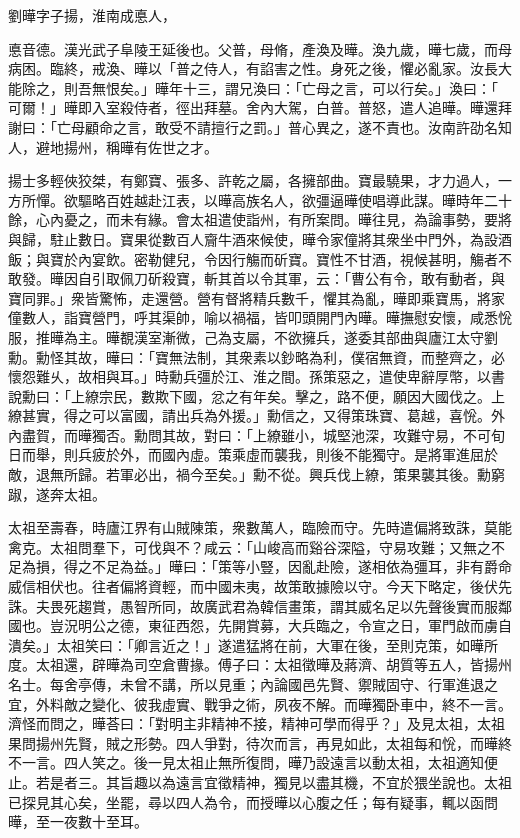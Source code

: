 
\begin{pinyinscope}
劉曄字子揚，淮南成悳人，

悳音德。漢光武子阜陵王延後也。父普，母脩，產渙及曄。渙九歲，曄七歲，而母病困。臨終，戒渙、曄以「普之侍人，有諂害之性。身死之後，懼必亂家。汝長大能除之，則吾無恨矣。」曄年十三，謂兄渙曰：「亡母之言，可以行矣。」渙曰：「𨚗可爾！」曄即入室殺侍者，徑出拜墓。舍內大駕，白普。普怒，遣人追曄。曄還拜謝曰：「亡母顧命之言，敢受不請擅行之罰。」普心異之，遂不責也。汝南許劭名知人，避地揚州，稱曄有佐世之才。

揚士多輕俠狡桀，有鄭寶、張多、許乾之屬，各擁部曲。寶最驍果，才力過人，一方所憚。欲驅略百姓越赴江表，以曄高族名人，欲彊逼曄使唱導此謀。曄時年二十餘，心內憂之，而未有緣。會太祖遣使詣州，有所案問。曄往見，為論事勢，要將與歸，駐止數日。寶果從數百人齎牛酒來候使，曄令家僮將其衆坐中門外，為設酒飯；與寶於內宴飲。密勒健兒，令因行觴而斫寶。寶性不甘酒，視候甚明，觴者不敢發。曄因自引取佩刀斫殺寶，斬其首以令其軍，云：「曹公有令，敢有動者，與寶同罪。」衆皆驚怖，走還營。營有督將精兵數千，懼其為亂，曄即乘寶馬，將家僮數人，詣寶營門，呼其渠帥，喻以禍福，皆叩頭開門內曄。曄撫慰安懷，咸悉恱服，推曄為主。曄覩漢室漸微，己為支屬，不欲擁兵，遂委其部曲與廬江太守劉勳。勳怪其故，曄曰：「寶無法制，其衆素以鈔略為利，僕宿無資，而整齊之，必懷怨難乆，故相與耳。」時勳兵彊於江、淮之間。孫策惡之，遣使卑辭厚幣，以書說勳曰：「上繚宗民，數欺下國，忿之有年矣。擊之，路不便，願因大國伐之。上繚甚實，得之可以富國，請出兵為外援。」勳信之，又得策珠寶、葛越，喜恱。外內盡賀，而曄獨否。勳問其故，對曰：「上繚雖小，城堅池深，攻難守易，不可旬日而舉，則兵疲於外，而國內虛。策乘虛而襲我，則後不能獨守。是將軍進屈於敵，退無所歸。若軍必出，禍今至矣。」勳不從。興兵伐上繚，策果襲其後。勳窮踧，遂奔太祖。

太祖至壽春，時廬江界有山賊陳策，衆數萬人，臨險而守。先時遣偏將致誅，莫能禽克。太祖問羣下，可伐與不？咸云：「山峻高而谿谷深隘，守易攻難；又無之不足為損，得之不足為益。」曄曰：「策等小豎，因亂赴險，遂相依為彊耳，非有爵命威信相伏也。往者偏將資輕，而中國未夷，故策敢據險以守。今天下略定，後伏先誅。夫畏死趨賞，愚智所同，故廣武君為韓信畫策，謂其威名足以先聲後實而服鄰國也。豈況明公之德，東征西怨，先開賞募，大兵臨之，令宣之日，軍門啟而虜自潰矣。」太祖笑曰：「卿言近之！」遂遣猛將在前，大軍在後，至則克策，如曄所度。太祖還，辟曄為司空倉曹掾。傅子曰：太祖徵曄及蔣濟、胡質等五人，皆揚州名士。每舍亭傳，未曾不講，所以見重；內論國邑先賢、禦賊固守、行軍進退之宜，外料敵之變化、彼我虛實、戰爭之術，夙夜不解。而曄獨卧車中，終不一言。濟怪而問之，曄荅曰：「對明主非精神不接，精神可學而得乎？」及見太祖，太祖果問揚州先賢，賊之形勢。四人爭對，待次而言，再見如此，太祖每和恱，而曄終不一言。四人笑之。後一見太祖止無所復問，曄乃設遠言以動太祖，太祖適知便止。若是者三。其旨趣以為遠言宜徵精神，獨見以盡其機，不宜於猥坐說也。太祖已探見其心矣，坐罷，尋以四人為令，而授曄以心腹之任；每有疑事，輒以函問曄，至一夜數十至耳。


\end{pinyinscope}
